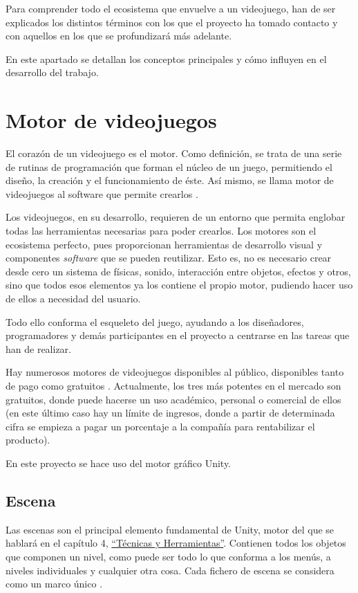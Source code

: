  \label{cap:conceptos}
Para comprender todo el ecosistema que envuelve a un videojuego, han de ser explicados los distintos términos con los que el proyecto ha tomado contacto y con aquellos en los que se profundizará más adelante.

En este apartado se detallan los conceptos principales y cómo influyen en el desarrollo del trabajo.

\section{Motor de videojuegos}

El corazón de un videojuego es el motor. Como definición, se trata de una serie de rutinas de programación que forman el núcleo de un juego, permitiendo el diseño, la creación y el funcionamiento de éste. Así mismo, se llama motor de videojuegos al software que permite crearlos \cite{hardz:motgraf}.

Los videojuegos, en su desarrollo, requieren de un entorno que permita englobar todas las herramientas necesarias para poder crearlos. Los motores son el ecosistema perfecto, pues proporcionan herramientas de desarrollo visual y componentes \textit{software} que se pueden reutilizar. Esto es, no es necesario crear desde cero un sistema de físicas, sonido, interacción entre objetos, efectos y otros, sino que todos esos elementos ya los contiene el propio motor, pudiendo hacer uso de ellos a necesidad del usuario. 

Todo ello conforma el esqueleto del juego, ayudando a los diseñadores, programadores y demás participantes en el proyecto a centrarse en las tareas que han de realizar.

Hay numerosos motores de videojuegos disponibles al público, disponibles tanto de pago como gratuitos \cite{vand:mejmotgraf}. Actualmente, los tres más potentes en el mercado son gratuitos, donde puede hacerse un uso académico, personal o comercial de ellos (en este último caso hay un límite de ingresos, donde a partir de determinada cifra se empieza a pagar un porcentaje a la compañía para rentabilizar el producto).

En este proyecto se hace uso del motor gráfico Unity.

\subsection{Escena}

Las escenas son el principal elemento fundamental de Unity, motor del que se hablará en el capítulo 4, \hyperref[cap:tecnicas]{``Técnicas y Herramientas''}. Contienen todos los objetos que componen un nivel, como puede ser todo lo que conforma a los menús, a niveles individuales y cualquier otra cosa. Cada fichero de escena se considera como un marco único \cite{doc:scene}.

